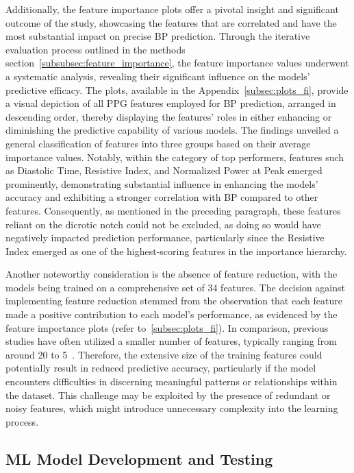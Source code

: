 Additionally, the feature importance plots offer a pivotal insight and significant outcome of the study, showcasing the features that are correlated and have the most substantial impact on precise BP prediction.
Through the iterative evaluation process outlined in the methods section~\ref{subsubsec:feature_importance}, the feature importance values underwent a systematic analysis,
revealing their significant influence on the models' predictive efficacy.
The plots, available in the Appendix~\ref{subsec:plots_fi}, provide a visual depiction of all PPG features employed for BP prediction, arranged in descending order,
thereby displaying the features' roles in either enhancing or diminishing the predictive capability of various models.
The findings unveiled a general classification of features into three groups based on their average importance values.
Notably, within the category of top performers, features such as Diastolic Time, Resistive Index, and Normalized Power at Peak emerged prominently,
demonstrating substantial influence in enhancing the models' accuracy and exhibiting a stronger correlation with BP compared to other features.
Consequently, as mentioned in the preceding paragraph, these features reliant on the dicrotic notch could not be excluded, as doing so would have negatively impacted prediction performance,
particularly since the Resistive Index emerged as one of the highest-scoring features in the importance hierarchy.

Another noteworthy consideration is the absence of feature reduction, with the models being trained on a comprehensive set of 34 features.
The decision against implementing feature reduction stemmed from the observation that each feature made a positive contribution to each model's performance,
as evidenced by the feature importance plots (refer to~\ref{subsec:plots_fi}).
In comparison, previous studies have often utilized a smaller number of features, typically ranging from around 20 to 5~\cite{el-hajjDeepLearningModels2021, charltonAssessingHemodynamicsPhotoplethysmogram2022, yilmazNocturnalBloodPressure2023}.
Therefore, the extensive size of the training features could potentially result in reduced predictive accuracy,
particularly if the model encounters difficulties in discerning meaningful patterns or relationships within the dataset.
This challenge may be exploited by the presence of redundant or noisy features, which might introduce unnecessary complexity into the learning process.

\subsection{ML Model Development and Testing}
\label{subsec:ml-model-development-and-testing}

